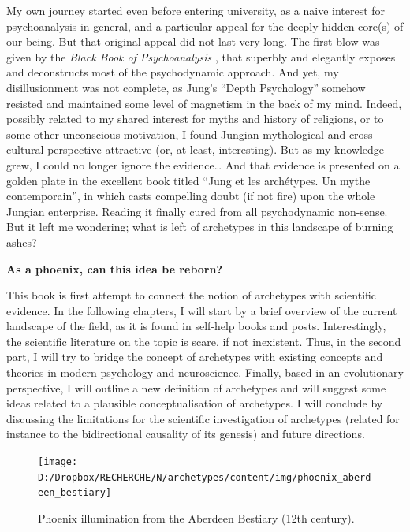 \documentclass[
]{book}
\begin{document}
My own journey started even before entering university, as a naive interest for psychoanalysis in general, and a particular appeal for the deeply hidden core(s) of our being. But that original appeal did not last very long. The first blow was given by the \emph{Black Book of Psychoanalysis} \citep[``Le livre noir de la psychanalyse'';][]{borch2005livre}, that superbly and elegantly exposes and deconstructs most of the psychodynamic approach. And yet, my disillusionment was not complete, as Jung's ``Depth Psychology'' somehow resisted and maintained some level of magnetism in the back of my mind. Indeed, possibly related to my shared interest for myths and history of religions, or to some other unconscious motivation, I found Jungian mythological and cross-cultural perspective attractive (or, at least, interesting). But as my knowledge grew, I could no longer ignore the evidence\ldots{} And that evidence is presented on a golden plate in the excellent book titled ``Jung et les archétypes. Un mythe contemporain'', in which \citet{lequellec2013jung} casts compelling doubt (if not fire) upon the whole Jungian enterprise. Reading it finally cured from all psychodynamic non-sense. But it left me wondering; what is left of archetypes in this landscape of burning ashes?

\textbf{As a phoenix, can this idea be reborn?}

This book is first attempt to connect the notion of archetypes with scientific evidence. In the following chapters, I will start by a brief overview of the current landscape of the field, as it is found in self-help books and posts. Interestingly, the scientific literature on the topic is scare, if not inexistent. Thus, in the second part, I will try to bridge the concept of archetypes with existing concepts and theories in modern psychology and neuroscience. Finally, based in an evolutionary perspective, I will outline a new definition of archetypes and will suggest some ideas related to a plausible conceptualisation of archetypes. I will conclude by discussing the limitations for the scientific investigation of archetypes (related for instance to the bidirectional causality of its genesis) and future directions.

\begin{figure}

{\centering \texttt{[image: D:/Dropbox/RECHERCHE/N/archetypes/content/img/phoenix\_aberdeen\_bestiary]} 

}

\caption{Phoenix illumination from the Aberdeen Bestiary (12th century).}\label{fig:unnamed-chunk-5}
\end{figure}
\end{document}
